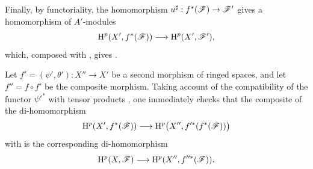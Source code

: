 \begin{env}[12.1.3]
Finally, by functoriality, the homomorphism
$u^\sharp:f^*(\mathscr{F})\to\mathscr{F}'$ gives a homomorphism of
$A'$-modules
\[
  \mathrm{H}^p(X',f^*(\mathscr{F}))
  \longrightarrow
  \mathrm{H}^p(X',\mathscr{F}'),
\]
which, composed with , gives
.

Let $f'=(\psi',\theta'):X''\to X'$ be a second morphism of ringed
spaces, and let $f''=f\circ f'$ be the composite morphism.
Taking account of the compatibility of the functor $\psi'^*$ with
tensor products , one immediately
checks that the composite of the di-homomorphism
\[
  \mathrm{H}^p(X',f^*(\mathscr{F}))
  \longrightarrow
  \mathrm{H}^p\bigl(X'',f'^*(f^*(\mathscr{F}))\bigr)
\]
with  is the corresponding di-homomorphism
\[
  \mathrm{H}^p(X,\mathscr{F})
  \longrightarrow
  \mathrm{H}^p(X'',f''^*(\mathscr{F})).
\]
\end{env}

